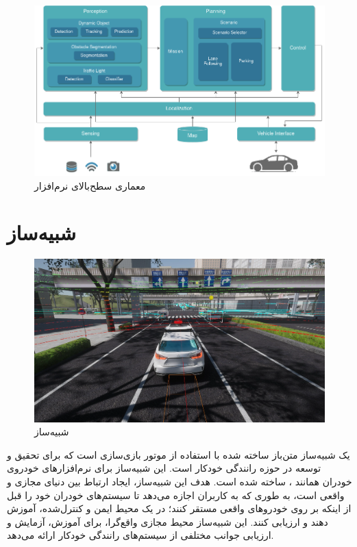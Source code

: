 \begin{figure}[h!]
    \centering
    \includegraphics[width=1\linewidth]{figures/Autoware_Architecture.png}
    \caption{معماری سطح‌‌بالای نرم‌افزار  \cite{Autoware:Documentation}}
    \label{fig:Autoware_Architecture}
\end{figure}

\section{شبیه‌ساز }
\begin{figure}[h!]
    \centering
    \includegraphics[width=1\linewidth]{figures/E2ESim.png}
    \caption{شبیه‌ساز  \cite{AWSIM:Documentation}}
    \label{fig:AWSIM}
\end{figure}

 یک شبیه‌ساز متن‌باز ساخته شده با استفاده از موتور بازی‌سازی  است که برای تحقیق و توسعه در حوزه رانندگی خودکار است. این شبیه‌ساز برای نرم‌افزارهای خودروی خودران همانند ، ساخته شده است. هدف این شبیه‌ساز، ایجاد ارتباط بین دنیای مجازی و واقعی است، به طوری که به کاربران اجازه می‌دهد تا سیستم‌های خودران خود را قبل از اینکه بر روی خودروهای واقعی مستقر کنند؛ در یک محیط ایمن و کنترل‌شده، آموزش دهند و ارزیابی کنند. این شبیه‌ساز محیط مجازی واقع‌گرا، برای آموزش، آزمایش و ارزیابی جوانب مختلفی از سیستم‌های رانندگی خودکار ارائه می‌دهد.


